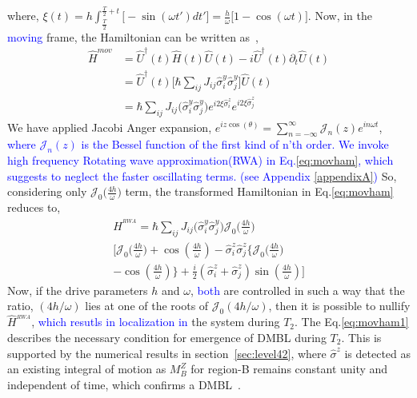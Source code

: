 \documentclass[%
reprint,
superscriptaddress,
amsmath,amssymb,showkeys,
aps,
prb,
]{revtex4-2}
\newcommand{\blue}[1]{\textcolor{blue}{#1}}
\begin{document}
	where, $\displaystyle{
		\xi (t) = h\int_{\frac{T}{2}}^{\frac{T}{2}+t}  \Big[-\sin(\omega t')dt'\Big]=  \frac{h}{\omega}\Big[1-\cos(\omega t)\Big]}$.		
	Now, in the \blue{moving} frame, the Hamiltonian can be written as~\cite{haldar_dynamical_2021},
	\begin{align}
		\hat{H}^{mov} &= \hat{U}^\dagger(t) \hat{H}(t) \hat{U}(t)- i \hat{U}^\dagger(t) \partial_t \hat{U}(t)\nonumber\\
		&= \hat{U}^\dagger(t) \big[\hbar\sum_{ij}J_{ij}\hat{\sigma}^y_i\hat{\sigma}^y_j\big] \hat{U}(t)\nonumber\\
		&=\hbar\sum_{ij} J_{ij} \Big(\hat{\sigma}^y_i\hat{\sigma}^y_j\Big) e^{i 2\xi \hat{\sigma}^z_i}  e^{i 2\xi \hat{\sigma}^z_j}
		\label{eq:movham}
	\end{align}
	We have applied Jacobi Anger expansion, $\displaystyle e^{iz \cos(\theta)} = \sum_{n=-\infty}^{\infty} \mathcal{J}_n(z) e^{in\omega t}$, \blue{where $\mathcal{J}_n(z)$ is the Bessel function of the first kind of n'th order. We invoke high frequency Rotating wave approximation(RWA)\cite{das_exotic_2010, Ashhab2007, Kiely2018, haldar_dynamical_2017,fuji2017} in Eq.\eqref{eq:movham}, which suggests to neglect the faster oscillating terms. (see Appendix \ref{appendixA})}  So, considering only $\mathcal{J}_0\big(\frac{4h}{\omega}\big)$ term, the transformed Hamiltonian in Eq.\eqref{eq:movham} reduces to,
	\begin{multline}
		\hat{H}^{_{RWA}} = \hbar\sum_{ij} J_{ij} \Big(\hat{\sigma}^y_i\hat{\sigma}^y_j\Big) \mathcal{J}_0\Big(\frac{4h}{\omega}\Big)\\
		\Bigg[\mathcal{J}_0\Big(\frac{4h}{\omega}\Big) + \cos(\frac{4h}{\omega})-\hat{\sigma}^z_i\hat{\sigma}^z_j \Bigg\{\mathcal{J}_0\Big(\frac{4h}{\omega}\Big)\\
		 - \cos(\frac{4h}{\omega})\Bigg\} + \frac{i}{2} (\hat{\sigma}^z_i + \hat{\sigma}^z_j) \sin(\frac{4h}{\omega})\Bigg]
		\label{eq:movham1}
	\end{multline}
	Now, if the drive parameters $h$ and $\omega$, \blue{both} are controlled in such a way that the ratio, $({4h}/{\omega})$ lies at one of the roots of $\mathcal{J}_0(4h/\omega)$, then it is possible to nullify $\hat{H}^{_{RWA}}$, \blue{which resutls in localization in} the system during $T_2$. The Eq.\eqref{eq:movham1} describes the necessary condition for emergence of DMBL during $T_2$. This is supported by the numerical results in section~\ref{sec:level42}, where $\hat{\sigma}^z$ is detected as an existing integral of motion as $M^Z_B$ for region-B remains constant unity and independent of time, which confirms a DMBL~\cite{Keser2016,Dodonov1978}. 
	
\end{document}
